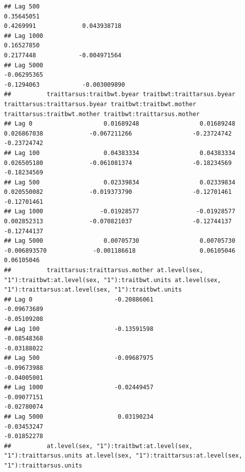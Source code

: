 \documentclass[
  12pt,
]{book}
\begin{document}
\begin{verbatim}
## Lag 500                                                         0.35645051                                                            0.4269991             0.043938718
## Lag 1000                                                        0.16527850                                                            0.2177448            -0.004971564
## Lag 5000                                                       -0.06295365                                                           -0.1294063            -0.003009890
##          traittarsus:traitbwt.byear traitbwt:traittarsus.byear traittarsus:traittarsus.byear traitbwt:traitbwt.mother traittarsus:traitbwt.mother traitbwt:traittarsus.mother
## Lag 0                    0.01689248                 0.01689248                   0.026867038             -0.067211266                 -0.23724742                 -0.23724742
## Lag 100                  0.04383334                 0.04383334                   0.026505180             -0.061081374                 -0.18234569                 -0.18234569
## Lag 500                  0.02339834                 0.02339834                   0.020550082             -0.019373790                 -0.12701461                 -0.12701461
## Lag 1000                -0.01928577                -0.01928577                   0.002852313             -0.070821037                 -0.12744137                 -0.12744137
## Lag 5000                 0.00705730                 0.00705730                  -0.006893570             -0.001186618                  0.06105046                  0.06105046
##          traittarsus:traittarsus.mother at.level(sex, "1"):traitbwt:at.level(sex, "1"):traitbwt.units at.level(sex, "1"):traittarsus:at.level(sex, "1"):traitbwt.units
## Lag 0                       -0.20886061                                                   -0.09673689                                                      -0.05109208
## Lag 100                     -0.13591598                                                   -0.08548368                                                      -0.03188022
## Lag 500                     -0.09687975                                                   -0.09673988                                                      -0.04005001
## Lag 1000                    -0.02449457                                                   -0.09077151                                                      -0.02780074
## Lag 5000                     0.03190234                                                   -0.03453247                                                      -0.01852278
##          at.level(sex, "1"):traitbwt:at.level(sex, "1"):traittarsus.units at.level(sex, "1"):traittarsus:at.level(sex, "1"):traittarsus.units

\end{verbatim}
\end{document}
